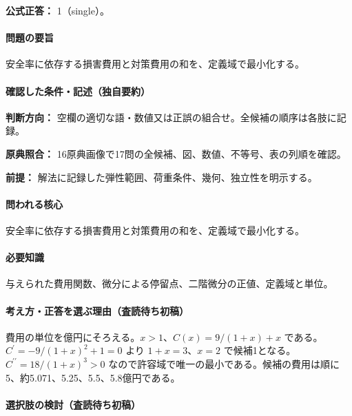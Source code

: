 \textbf{公式正答：} 1（single）。

\paragraph{問題の要旨} 安全率に依存する損害費用と対策費用の和を、定義域で最小化する。

\paragraph{確認した条件・記述（独自要約）}\mbox{}\par

\noindent\textbf{判断方向：} 空欄の適切な語・数値又は正誤の組合せ。全候補の順序は各肢に記録。\par

\noindent\textbf{原典照合：} 16原典画像で17問の全候補、図、数値、不等号、表の列順を確認。\par

\noindent\textbf{前提：} 解法に記録した弾性範囲、荷重条件、幾何、独立性を明示する。\par

\paragraph{問われる核心} 安全率に依存する損害費用と対策費用の和を、定義域で最小化する。

\paragraph{必要知識} 与えられた費用関数、微分による停留点、二階微分の正値、定義域と単位。

\paragraph{考え方・正答を選ぶ理由（査読待ち初稿）} 費用の単位を億円にそろえる。\(x>1\)、\(C(x)=9/(1+x)+x\) である。\(C^\prime=-9/(1+x)^2+1=0\) より \(1+x=3\)、\(x=2\) で候補1となる。\(C^{\prime\prime}=18/(1+x)^3>0\) なので許容域で唯一の最小である。候補の費用は順に5、約5.071、5.25、5.5、5.8億円である。

\paragraph{選択肢の検討（査読待ち初稿）}\mbox{}\par


